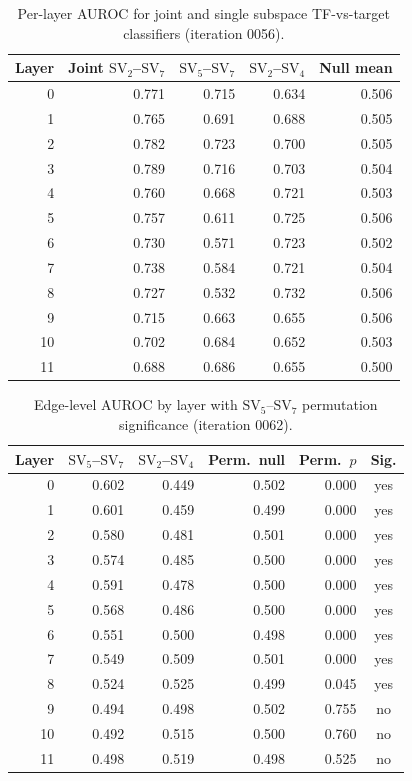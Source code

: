 \documentclass[10pt,twocolumn]{article}
\newcommand{\SV}[1]{\mathrm{SV}_{#1}}
\begin{document}
\begin{table}[H]
\centering
\caption{Per-layer AUROC for joint and single subspace TF-vs-target classifiers (iteration 0056).}
\label{tab:layer_auroc_full}
\begin{tabular}{rrrrr}
\toprule
Layer & Joint $\SV{2}$--$\SV{7}$ & $\SV{5}$--$\SV{7}$ & $\SV{2}$--$\SV{4}$ & Null mean \\
\midrule
0 & 0.771 & 0.715 & 0.634 & 0.506 \\
1 & 0.765 & 0.691 & 0.688 & 0.505 \\
2 & 0.782 & 0.723 & 0.700 & 0.505 \\
3 & 0.789 & 0.716 & 0.703 & 0.504 \\
4 & 0.760 & 0.668 & 0.721 & 0.503 \\
5 & 0.757 & 0.611 & 0.725 & 0.506 \\
6 & 0.730 & 0.571 & 0.723 & 0.502 \\
7 & 0.738 & 0.584 & 0.721 & 0.504 \\
8 & 0.727 & 0.532 & 0.732 & 0.506 \\
9 & 0.715 & 0.663 & 0.655 & 0.506 \\
10 & 0.702 & 0.684 & 0.652 & 0.503 \\
11 & 0.688 & 0.686 & 0.655 & 0.500 \\
\bottomrule
\end{tabular}
\end{table}

\begin{table}[H]
\centering
\caption{Edge-level AUROC by layer with $\SV{5}$--$\SV{7}$ permutation significance (iteration 0062).}
\label{tab:edge_auroc_full}
\begin{tabular}{rrrrrc}
\toprule
Layer & $\SV{5}$--$\SV{7}$ & $\SV{2}$--$\SV{4}$ & Perm.\ null & Perm.\ $p$ & Sig. \\
\midrule
0 & 0.602 & 0.449 & 0.502 & 0.000 & yes \\
1 & 0.601 & 0.459 & 0.499 & 0.000 & yes \\
2 & 0.580 & 0.481 & 0.501 & 0.000 & yes \\
3 & 0.574 & 0.485 & 0.500 & 0.000 & yes \\
4 & 0.591 & 0.478 & 0.500 & 0.000 & yes \\
5 & 0.568 & 0.486 & 0.500 & 0.000 & yes \\
6 & 0.551 & 0.500 & 0.498 & 0.000 & yes \\
7 & 0.549 & 0.509 & 0.501 & 0.000 & yes \\
8 & 0.524 & 0.525 & 0.499 & 0.045 & yes \\
9 & 0.494 & 0.498 & 0.502 & 0.755 & no \\
10 & 0.492 & 0.515 & 0.500 & 0.760 & no \\
11 & 0.498 & 0.519 & 0.498 & 0.525 & no \\
\bottomrule
\end{tabular}
\end{table}
\end{document}
